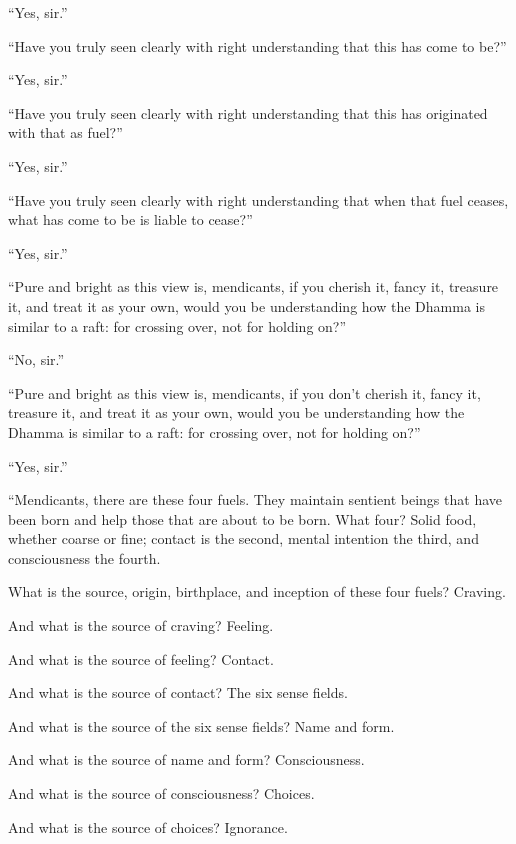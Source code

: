 \documentclass[12pt,openany]{book}%
\begin{document}
“Yes, sir.” 

“Have you truly seen clearly with right understanding that this has come to be?” 

“Yes, sir.” 

“Have you truly seen clearly with right understanding that this has originated with that as fuel?” 

“Yes, sir.” 

“Have you truly seen clearly with right understanding that when that fuel ceases, what has come to be is liable to cease?” 

“Yes, sir.” 

“Pure and bright as this view is, mendicants, if you cherish it, fancy it, treasure it, and treat it as your own, would you be understanding how the Dhamma is similar to a raft: for crossing over, not for holding on?” 

“No, sir.” 

“Pure and bright as this view is, mendicants, if you don’t cherish it, fancy it, treasure it, and treat it as your own, would you be understanding how the Dhamma is similar to a raft: for crossing over, not for holding on?” 

“Yes, sir.” 

“Mendicants, there are these four fuels. They maintain sentient beings that have been born and help those that are about to be born. What four? Solid food, whether coarse or fine; contact is the second, mental intention the third, and consciousness the fourth. 

What is the source, origin, birthplace, and inception of these four fuels? Craving. 

And what is the source of craving? Feeling. 

And what is the source of feeling? Contact. 

And what is the source of contact? The six sense fields. 

And what is the source of the six sense fields? Name and form. 

And what is the source of name and form? Consciousness. 

And what is the source of consciousness? Choices. 

And what is the source of choices? Ignorance. 
\end{document}
